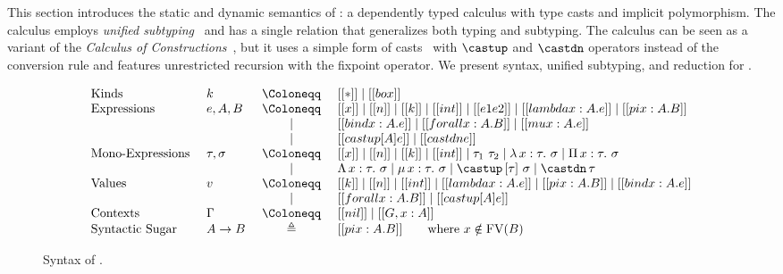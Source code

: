 \section{\System}
\label{sec:system}

This section introduces the static and dynamic semantics of
\name: a dependently typed calculus with type casts
and implicit polymorphism. The calculus employs
\emph{unified subtyping}~\cite{full}
and has a single relation that generalizes both typing and subtyping.
The calculus can be seen as a variant of the \emph{Calculus of Constructions}~\cite{coc},
but it uses a simple form of casts~\cite{isotype,yang2019pure} with $\castup$ and $\castdn$ operators
instead of the conversion rule and features unrestricted recursion with the fixpoint operator.
We present syntax, unified subtyping, and reduction for \name.

\begin{figure}[t]
\centering
\begin{equation*}
\begin{array}{llcl}
    \text{Kinds} & k & ~\Coloneqq ~ & [[*]] \mid [[box]] \\
    \text{Expressions} & e, A, B & ~ \Coloneqq ~ & [[x]] \mid [[n]] \mid [[k]] \mid [[int]] \mid [[e1 e2]] \mid [[lambda x : A. e]] \mid [[pi x : A. B]] \\
        & & \mid & [[bind x : A. e]] \mid [[forall x : A. B]] \mid [[mu x : A. e]] \\
        & & \mid & [[castup [A] e]] \mid [[castdn e]]   \\
    \text{Mono-Expressions} ~ & \tau, \sigma & ~ \Coloneqq ~ & [[x]] \mid [[n]] \mid [[k]] \mid [[int]] \mid \tau_1 ~ \tau_2 \mid \lambda \, x : \tau. ~ \sigma \mid \Pi \, x : \tau. ~ \sigma \\
        & & \mid & \Lambda \, x : \tau. ~ \sigma \mid \mu \, x : \tau. ~ \sigma \mid \castup \, [\tau]~ \sigma \mid \castdn \, \tau \\
    \text{Values} & v & ~ \Coloneqq ~ & [[k]] \mid [[n]] \mid [[int]] \mid [[lambda x : A. e]] \mid [[pi x : A. B]] \mid [[bind x : A. e]] \\
        & & \mid & [[forall x : A. B]] \mid [[castup [A] e]] \\
    \text{Contexts} & \Gamma & ~ \Coloneqq ~ & [[nil]] \mid [[G , x : A]] \\
    \text{Syntactic Sugar} ~ & A \rightarrow B & \triangleq & [[pi x : A. B]] \qquad \text{where} ~ x \notin \mathrm{FV}(B)
\end{array}
\end{equation*}
\caption{Syntax of \name.}
\label{fig:syntax}
\end{figure}
